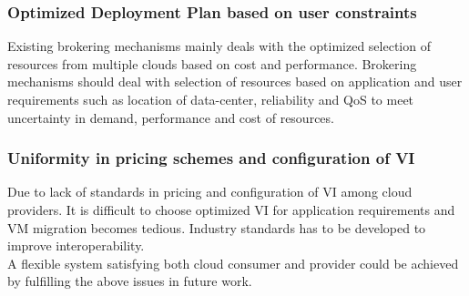 \documentclass[conference]{IEEEtran}
\begin{document}
\subsubsection{Optimized Deployment Plan based on user constraints} Existing brokering mechanisms mainly deals with the optimized selection of resources from multiple clouds based on cost and performance. Brokering mechanisms should deal with selection of resources based on application and user requirements such as location of data-center, reliability and QoS to meet uncertainty in demand, performance and cost of resources.
\subsubsection{Uniformity in pricing schemes and configuration of VI} Due to lack of standards in pricing and configuration of VI among cloud providers. It is difficult to choose optimized VI for application requirements and VM migration becomes tedious. Industry standards has to be developed to improve interoperability.\\

A flexible system satisfying both cloud consumer and provider could be achieved by fulfilling the above issues in future work.
\end{document}
